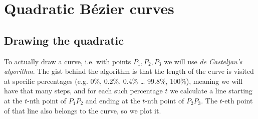 \documentclass[12pt,openany,a4,usenames,dvipsnames]{book}
\begin{document}
\section{Quadratic Bézier curves}
\subsection{Drawing the quadratic}
To actually draw a curve, i.e. with points $P_1,P_2,P_3$ we will use \emph{de Casteljau's algorithm}. The gist behind the algorithm is that the length of the curve is visited at specific percentages (e.g. 0\%, 0.2\%, 0.4\% \ldots{} 99.8\%, 100\%), meaning we will have that many steps, and for each such percentage $t$ we calculate a line starting at the $t$-nth point of $P_{1}P_{2}$ and ending at the $t$-nth point of $P_{2}P_{3}$. The $t$-eth point of that line also belongs to the curve, so we plot it.
\end{document}
